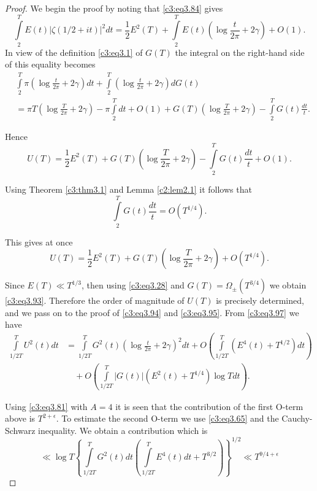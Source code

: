 \begin{proof}
  We begin the proof by noting that \eqref{c3:eq3.84} gives 
  $$
  \int\limits_2^T E(t) |\zeta (1/2 + it)|^2 dt = \frac{1}{2} E^2 (T) +
  \int\limits_2^T E(t) \left(\log \frac{t}{2 \pi}+ 2 \gamma \right) + O(1).
  $$
  In view of the definition \eqref{c3:eq3.1} of $G(T)$ the integral on
  the right-hand side of this equality becomes
{\fontsize{10pt}{12pt}\selectfont
  \begin{align*}
&    \int\limits_2^T \pi \left(\log \frac{t}{2 \pi} + 2 \gamma
    \right)dt + \int\limits_2^T \left(\log \frac{t}{2 \pi} + 2 \gamma
    \right) dG(t)\\
&    = \pi T \left(\log \frac{T}{2 \pi} + 2 \gamma \right) - \pi
    \int\limits_2^T dt + O(1) + G(T) \left(\log \frac{T}{2 \pi} + 2
    \gamma\right) - \int\limits_2^T G(t) \frac{dt}{t}. 
\end{align*}}

Hence\pageoriginale
$$
U(T) = \frac{1}{2} E^2 (T) + G(T) \left(\log \frac{T}{2 \pi} + 2
\gamma \right) - \int\limits_2^T G(t) \frac{dt}{t} + O(1).
$$

Using Theorem \ref{c3:thm3.1} and Lemma \ref{c2:lem2.1} it follows
that 
\begin{equation}
  \int\limits_2^T G(t) \frac{dt}{t} = O(T^{1/4}). \label{c3:eq3.96}
\end{equation}

This gives at once
\begin{equation}
  U(T) = \frac{1}{2} E^2 (T) + G(T) \left(\log \frac{T}{2 \pi}
  + 2 \gamma \right) + O(T^{1/4}).\label{c3:eq3.97}
\end{equation}

Since $E(T) \ll T^{1/3}$, then using \eqref{c3:eq3.28} and $G(T)=
\Omega_\pm (T^{3/4})$ we obtain \eqref{c3:eq3.93}. Therefore the order
of magnitude of $U(T)$ is precisely determined, and we pass on to the
proof of \eqref{c3:eq3.94} and \eqref{c3:eq3.95}. From
\eqref{c3:eq3.97} we have
\begin{align*}
  \int\limits_{1/2 T}^T U^2 (t) dt &= \int\limits_{1/2 T}^T G^2 (t)
  \left(\log \frac{t}{2 \pi} + 2 \gamma \right)^2 dt+ O\left(\int\limits_{1/2 T}^T (E^4 (t) + T^{1/2})dt \right)\\
&\quad 
  + O \left(\int\limits_{1/2 T}^T |G(t) |(E^2 (t) + T^{1/4}) 
  \log T dt \right).
 \end{align*}

Using \eqref{c3:eq3.81} with $A=4$ it is seen that the contribution of
the first O-term above is $T^{2+\epsilon}$. To estimate the second
O-term we use \eqref{c3:eq3.65} and the Cauchy-Schwarz inequality. We
obtain a contribution which is 
$$
\ll \log T \left\{ \int\limits_{1/2 T}^T G^2 (t) dt
\left(\int\limits_{1/2 T}^{T} E^4 (t) dt + T^{3/2} \right)
\right\}^{1/2} \ll T^{9/4+ \epsilon}
$$


\end{proof}
